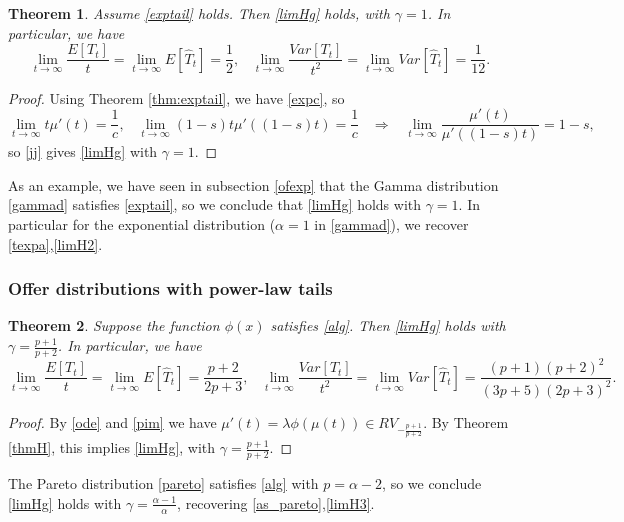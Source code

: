 \documentclass{article}
\newtheorem{thm}{Theorem}[section]
\numberwithin{equation}{section}
\begin{document}
\begin{thm}
Assume \eqref{exptail} holds. Then 
\eqref{limHg} holds, with $\gamma=1$.
In particular, we have
\begin{equation}\label{lg2}\lim_{t\rightarrow \infty}\frac{E[T_t]}{t}=\lim_{t\rightarrow \infty}E[\hat{T}_t]=\frac{1}{2},\;\;\;\lim_{t\rightarrow \infty}\frac{Var[T_t]}{t^2}=\lim_{t\rightarrow \infty}Var[\hat{T}_t]=\frac{1}{12}.\end{equation}
\end{thm}

\begin{proof}
Using Theorem \ref{thm:exptail},
we have \eqref{expc}, so
$$\lim_{t\rightarrow\infty} t\mu'(t)=\frac{1}{c},\;\;\;\lim_{t\rightarrow\infty} (1-s)t\mu'((1-s)t)=\frac{1}{c}\;\;\;\Rightarrow\;\;\;\lim_{t\rightarrow\infty}\frac{\mu'(t)}{\mu'((1-s)t)}=1-s,$$
so \eqref{jj} gives \eqref{limHg} with 
$\gamma=1$.
\end{proof}

As an example, we have seen in 
subsection \ref{ofexp} that the Gamma distribution \eqref{gammad} satisfies \eqref{exptail}, so we conclude that 
\eqref{limHg} holds with $\gamma=1$.
In particular for the exponential distribution ($\alpha=1$ in \eqref{gammad}), we recover \eqref{texpa},\eqref{limH2}.

\subsubsection{Offer distributions with power-law tails}

\begin{thm}
Suppose the function $\phi(x)$ 
satisfies \eqref{alg}. Then \eqref{limHg} holds with $\gamma=\frac{p+1}{p+2}$.
In particular, we have
\begin{equation}\label{lg}\lim_{t\rightarrow \infty}\frac{E[T_t]}{t}=\lim_{t\rightarrow \infty}E[\hat{T}_t]=\frac{p+2}{2p+3},\;\;\;\lim_{t\rightarrow \infty}\frac{Var[T_t]}{t^2}=\lim_{t\rightarrow \infty}Var[\hat{T}_t]=\frac{(p+1)(p+2)^2}{(3p+5)(2p+3)^2}.\end{equation}
\end{thm}

\begin{proof}
By \eqref{ode} and \eqref{pim} we have 
$\mu'(t)=\lambda \phi(\mu(t))\in RV_{-\frac{p+1}{p+2}}$. By Theorem 
\ref{thmH}, this implies \eqref{limHg}, with $\gamma=\frac{p+1}{p+2}$.
\end{proof}
The Pareto distribution 
\eqref{pareto} 
satisfies \eqref{alg} with $p=\alpha-2$, so we conclude 
\eqref{limHg} holds with 
$\gamma=\frac{\alpha-1}{\alpha}$, recovering \eqref{as_pareto},\eqref{limH3}.
\end{document}
